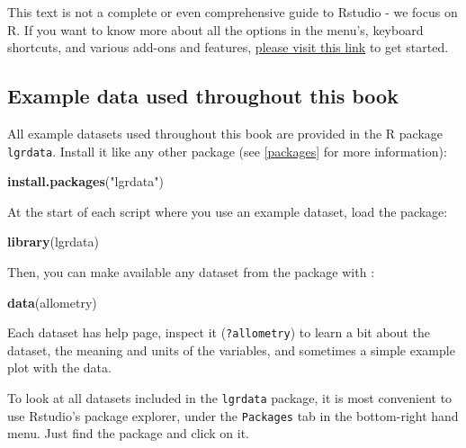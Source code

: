 \documentclass[]{book}
\newenvironment{Shaded}{\begin{snugshade}}{\end{snugshade}}
\newcommand{\KeywordTok}[1]{\textcolor[rgb]{0.13,0.29,0.53}{\textbf{#1}}}
\newcommand{\NormalTok}[1]{#1}
\newcommand{\StringTok}[1]{\textcolor[rgb]{0.31,0.60,0.02}{#1}}
\let\BeginKnitrBlock\begin \let\EndKnitrBlock\end
\begin{document}
\BeginKnitrBlock{rmdreading}
This text is not a complete or even comprehensive guide to Rstudio - we focus on R. If you want to know more about all the options in the menu's, keyboard shortcuts, and various add-ons and features, \href{https://support.rstudio.com/hc/en-us/sections/200107586-Using-the-RStudio-IDE}{please visit this link} to get started.
\EndKnitrBlock{rmdreading}

\hypertarget{exampledata}{%
\subsection{Example data used throughout this book}\label{exampledata}}

All example datasets used throughout this book are provided in the R package \texttt{lgrdata}. Install it like any other package (see \ref{packages} for more information):

\begin{Shaded}
\begin{Highlighting}[]
\KeywordTok{install.packages}\NormalTok{(}\StringTok{"lgrdata"}\NormalTok{)}
\end{Highlighting}
\end{Shaded}

At the start of each script where you use an example dataset, load the package:

\begin{Shaded}
\begin{Highlighting}[]
\KeywordTok{library}\NormalTok{(lgrdata)}
\end{Highlighting}
\end{Shaded}

Then, you can make available any dataset from the package with :

\begin{Shaded}
\begin{Highlighting}[]
\KeywordTok{data}\NormalTok{(allometry)}
\end{Highlighting}
\end{Shaded}

Each dataset has help page, inspect it (\texttt{?allometry}) to learn a bit about the dataset, the meaning and units of the variables, and sometimes a simple example plot with the data.

\BeginKnitrBlock{rmdtry}
To look at all datasets included in the \texttt{lgrdata} package, it is most convenient to use Rstudio's package explorer, under the \texttt{Packages} tab in the bottom-right hand menu. Just find the package and click on it.
\EndKnitrBlock{rmdtry}
\end{document}
